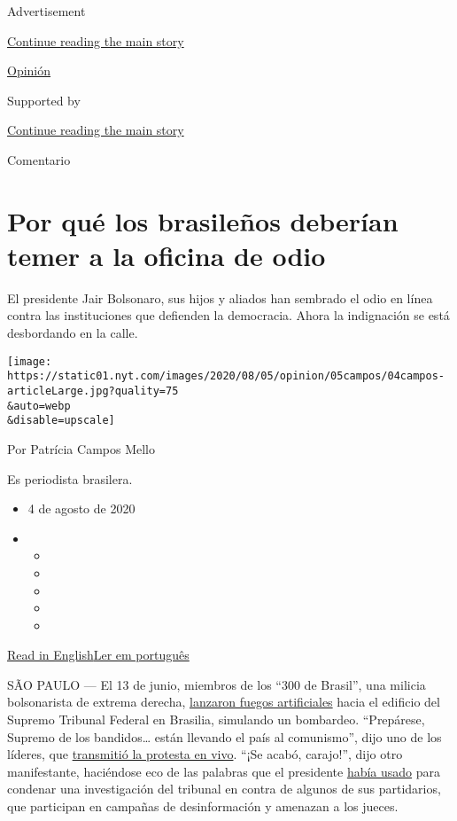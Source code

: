 Advertisement

\protect\hyperlink{after-top}{Continue reading the main story}

\href{/es/section/opinion}{Opinión}

Supported by

\protect\hyperlink{after-sponsor}{Continue reading the main story}

Comentario

\hypertarget{por-quuxe9-los-brasileuxf1os-deberuxedan-temer-a-la-oficina-de-odio}{%
\section{Por qué los brasileños deberían temer a la oficina de
odio}\label{por-quuxe9-los-brasileuxf1os-deberuxedan-temer-a-la-oficina-de-odio}}

El presidente Jair Bolsonaro, sus hijos y aliados han sembrado el odio
en línea contra las instituciones que defienden la democracia. Ahora la
indignación se está desbordando en la calle.

\texttt{[image: https://static01.nyt.com/images/2020/08/05/opinion/05campos/04campos-articleLarge.jpg?quality=75\\\&auto=webp\\\&disable=upscale]}

Por Patrícia Campos Mello

Es periodista brasilera.

\begin{itemize}
\item
  4 de agosto de 2020
\item
  \begin{itemize}
  \item
  \item
  \item
  \item
  \item
  \end{itemize}
\end{itemize}

\href{https://www.nytimes.com/2020/08/04/opinion/bolsonaro-office-of-hate-brazil.html}{Read
in
English}\href{https://www.nytimes.com/pt/2020/08/04/opinion/international-world/bolsonaro-gabinete-do-odio.html}{Ler
em português}

SÃO PAULO --- El 13 de junio, miembros de los ``300 de Brasil'', una
milicia bolsonarista de extrema derecha,
\href{https://www1.folha.uol.com.br/poder/2020/05/sara-winter-xinga-moraes-diz-querer-trocar-socos-com-ele-e-promete-inferniza-lo.shtml}{lanzaron
fuegos artificiales} hacia el edificio del Supremo Tribunal Federal en
Brasilia, simulando un bombardeo. ``Prepárese, Supremo de los
bandidos\ldots{} están llevando el país al comunismo'', dijo uno de los
líderes, que
\href{https://www.metropoles.com/brasil/video-bolsonaristas-lancam-fogos-de-artificio-em-predio-do-stf}{transmitió
la protesta en vivo}. ``¡Se acabó, carajo!'', dijo otro manifestante,
haciéndose eco de las palabras que el presidente
\href{https://www.youtube.com/watch?v=I2bZoC8FHJI}{había usado} para
condenar una investigación del tribunal en contra de algunos de sus
partidarios, que participan en campañas de desinformación y amenazan a
los jueces.


